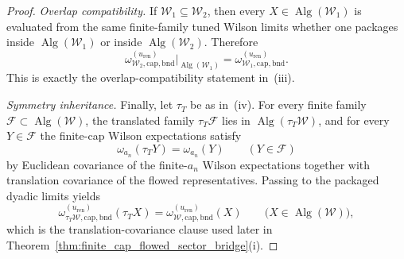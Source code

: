 \begin{proof}
\emph{Overlap compatibility.}
If $\mathcal W_1\subseteq \mathcal W_2$, then every $X\in \operatorname{Alg}(\mathcal W_1)$ is evaluated from the same finite-family tuned Wilson limits whether one packages inside $\operatorname{Alg}(\mathcal W_1)$ or inside $\operatorname{Alg}(\mathcal W_2)$.
Therefore
\[
\omega_{\mathcal W_2,\mathrm{cap,bnd}}^{(u_{\mathrm{ren}})}\big|_{\operatorname{Alg}(\mathcal W_1)}
=
\omega_{\mathcal W_1,\mathrm{cap,bnd}}^{(u_{\mathrm{ren}})}.
\]
This is exactly the overlap-compatibility statement in~(iii).

\emph{Symmetry inheritance.}
Finally, let $\tau_T$ be as in~(iv).
For every finite family $\mathcal F\subset \operatorname{Alg}(\mathcal W)$, the translated family $\tau_T\mathcal F$ lies in $\operatorname{Alg}(\tau_T\mathcal W)$, and for every $Y\in \mathcal F$ the finite-cap Wilson expectations satisfy
\[
\omega_{a_n}(\tau_TY)=\omega_{a_n}(Y)
\qquad
(Y\in \mathcal F)
\]
by Euclidean covariance of the finite-$a_n$ Wilson expectations together with translation covariance of the flowed representatives.
Passing to the packaged dyadic limits yields
\[
\omega_{\tau_T\mathcal W,\mathrm{cap,bnd}}^{(u_{\mathrm{ren}})}(\tau_TX)
=
\omega_{\mathcal W,\mathrm{cap,bnd}}^{(u_{\mathrm{ren}})}(X)
\qquad
\bigl(X\in \operatorname{Alg}(\mathcal W)\bigr),
\]
which is the translation-covariance clause used later in Theorem~\ref{thm:finite_cap_flowed_sector_bridge}(i).
\end{proof}

